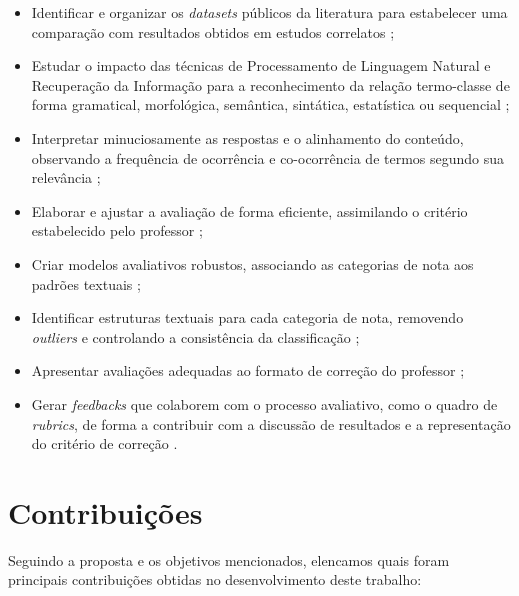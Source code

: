 \begin{itemize}
\item Identificar e organizar os \textit{datasets} públicos da literatura para estabelecer uma comparação com resultados obtidos em estudos correlatos \cite{burrows2015};
\item Estudar o impacto das técnicas de Processamento de Linguagem Natural e Recuperação da Informação para a reconhecimento da relação termo-classe de forma gramatical, morfológica, semântica, sintática, estatística ou sequencial \cite{galhardi2018a, kumar2019, sahu2020};
\item Interpretar minuciosamente as respostas e o alinhamento do conteúdo, observando a frequência de ocorrência e co-ocorrência de termos segundo sua relevância \cite{jordan2012, saha2018, ding2020};
\item Elaborar e ajustar a avaliação de forma eficiente, assimilando o critério estabelecido pelo professor \cite{zesch2015, condor2020, lui2022};
\item Criar modelos avaliativos robustos, associando as categorias de nota aos padrões textuais \cite{butcher2010, heilman2015, burrows2015};
\item Identificar estruturas textuais para cada categoria de nota, removendo \textit{outliers} e controlando a consistência da classificação \cite{ding2020, filighera2020};
\item Apresentar avaliações adequadas ao formato de correção do professor \cite{higgins2014, funayama2020, pado2021};
\item Gerar \textit{feedbacks} que colaborem com o processo avaliativo, como o quadro de \textit{rubrics}, de forma a contribuir com a discussão de resultados e a representação do critério de correção \cite{mizumoto2019, suzen2020, bernius2022}.
\end{itemize}

\section{Contribuições} \label{cap1-contribuicoes}

Seguindo a proposta e os objetivos mencionados, elencamos quais foram principais contribuições obtidas no desenvolvimento deste trabalho:

